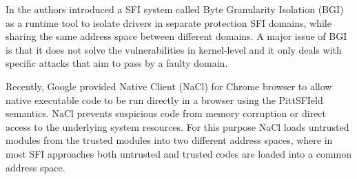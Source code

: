 In \cite{Castro-BGI} the authors introduced a SFI system called Byte
Granularity Isolation (BGI) as a runtime tool to isolate drivers in
separate protection SFI domains, while sharing the same address space
between different domains. 
A major issue of BGI is that it
does not solve the vulnerabilities in kernel-level and it only deals
with specific attacks that aim to pass by a faulty domain.

Recently, Google provided Native Client (NaCl) \cite{NaCl-09} for
Chrome browser to allow native executable code to be run directly in a
browser using the PittSFIeld semantics. NaCl prevents suspicious code
from memory corruption or direct access to the underlying system
resources. For this purpose NaCl loads untrusted modules from the
trusted modules into two different address spaces, where in most SFI
approaches both untrusted and trusted codes are loaded into a common
address space.

%



